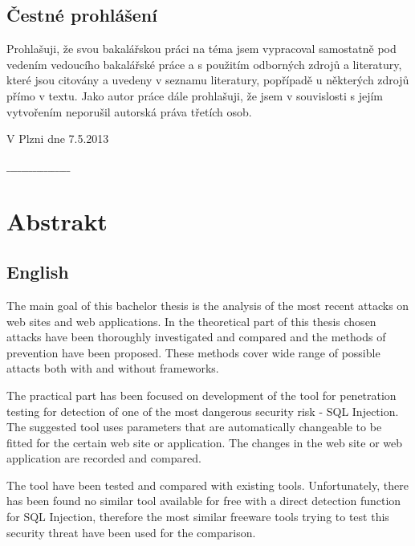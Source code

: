 \documentclass[12pt, a4paper]{report}
\begin{document}
\subsection*{Čestné prohlášení}
Prohlašuji, že svou bakalářskou práci na téma  jsem vypracoval samostatně pod vedením vedoucího bakalářské práce a s použitím odborných zdrojů a literatury, které jsou citovány a uvedeny v seznamu literatury, popřípadě u některých zdrojů přímo v textu. Jako autor práce dále prohlašuji, že jsem v souvislosti s jejím vytvořením neporušil autorská práva třetích osob.
\\[1.5cm]
\begin{minipage}{0.4\textwidth}
\begin{flushleft}
V Plzni dne 7.5.2013
\end{flushleft}
\end{minipage}
\begin{minipage}{0.6\textwidth}
\begin{flushright} 
$\_\_\_\_\_\_\_\_\_\_\_\_\_\_\_\_\_$
\end{flushright}
\end{minipage}
\newpage
\thispagestyle{empty}
\section*{Abstrakt}
\subsection*{English}
The main goal of this bachelor thesis is the analysis of the most recent attacks on web sites and web applications. In the theoretical part of this thesis chosen attacks have been thoroughly investigated and compared and the methods of prevention have been proposed. These methods cover wide range of possible attacts both with and without frameworks.

The practical part has been focused on development of the tool for penetration testing for detection of one of the most dangerous security risk - SQL Injection. The suggested tool uses parameters that are automatically changeable to be fitted for the certain web site or application. The changes in the web site or web application are recorded and compared.

The tool have been tested and compared with existing tools. Unfortunately, there has been found no similar tool available for free with a direct detection function for SQL Injection, therefore the most similar freeware tools trying to test this security threat have been used for the comparison.
\end{document}
